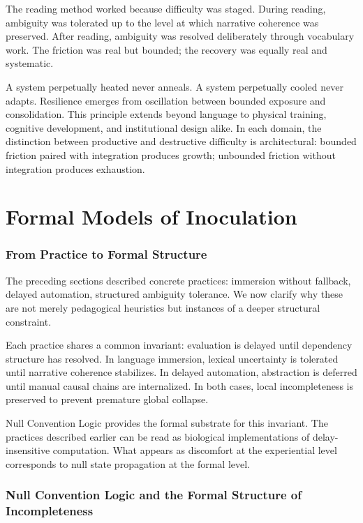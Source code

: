 \documentclass[11pt]{article}
\theoremstyle{remark}
\begin{document}
The reading method worked because difficulty was staged. During reading, ambiguity was tolerated up to the level at which narrative coherence was preserved. After reading, ambiguity was resolved deliberately through vocabulary work. The friction was real but bounded; the recovery was equally real and systematic.

A system perpetually heated never anneals. A system perpetually cooled never adapts. Resilience emerges from oscillation between bounded exposure and consolidation. This principle extends beyond language to physical training, cognitive development, and institutional design alike. In each domain, the distinction between productive and destructive difficulty is architectural: bounded friction paired with integration produces growth; unbounded friction without integration produces exhaustion.

\part{Formal Models of Inoculation}

\section{From Practice to Formal Structure}
\label{sec:bridge_practice}

The preceding sections described concrete practices: immersion without fallback, delayed automation, structured ambiguity tolerance. We now clarify why these are not merely pedagogical heuristics but instances of a deeper structural constraint.

Each practice shares a common invariant: evaluation is delayed until dependency structure has resolved. In language immersion, lexical uncertainty is tolerated until narrative coherence stabilizes. In delayed automation, abstraction is deferred until manual causal chains are internalized. In both cases, local incompleteness is preserved to prevent premature global collapse.

Null Convention Logic provides the formal substrate for this invariant. The practices described earlier can be read as biological implementations of delay-insensitive computation. What appears as discomfort at the experiential level corresponds to null state propagation at the formal level.

\section{Null Convention Logic and the Formal Structure of Incompleteness}
\label{sec:ncl}
\end{document}
